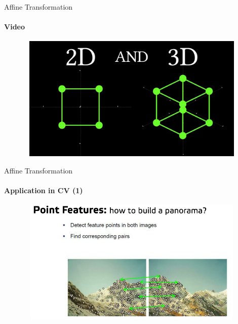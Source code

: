 \documentclass[aspectratio=169]{beamer}
\begin{document}
\begin{frame}[t]{Affine Transformation}
    \framesubtitle{Video}
    \vspace{-0.6cm}
    \begin{figure}[H]
        \href{https://youtu.be/E3Phj6J287o}{
            \centering\includegraphics[height=6cm,width=1\textwidth,keepaspectratio]{num_intuition_3d.jpg}}
        \label{fig:num_intuition_3d.jpg}
    \end{figure}
\end{frame}

\begin{frame}[t]{Affine Transformation}
    \framesubtitle{Application in CV (1)}
        \vspace{-0.6cm}
        \begin{figure}[H]
            \centering\includegraphics[height=6cm,width=1\textwidth,keepaspectratio]{cv_intro.png}
            \label{fig:cv_intro.png}
        \end{figure}
    \end{frame}
\end{document}

